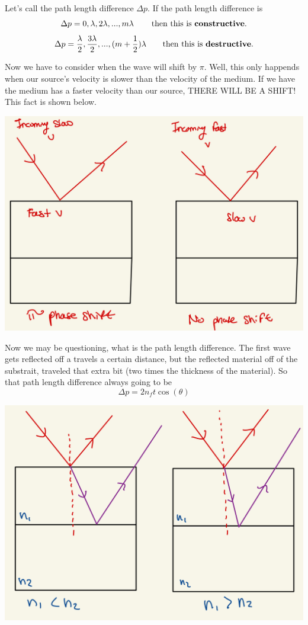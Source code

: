 \documentclass[10pt]{article}
\begin{document}
Let's call the path length difference $\Delta p$. If the path length difference is 
\[\Delta p = 0, \lambda, 2\lambda, ..., m\lambda\, \qquad \text{then this is \textbf{constructive}.}\]
\[\Delta p = \frac{\lambda}{2}, \frac{3\lambda}{2}, ..., (m+\frac{1}{2})\lambda \qquad \text{then this is \textbf{destructive}.}\]

Now we have to consider when the wave will shift by $\pi$. Well, this only happends when our source's velocity is slower than the velocity of the medium. If we have the medium has a faster velocity than our source, THERE WILL BE A SHIFT! This fact is shown below.

\begin{center}
    \includegraphics*[scale = .2]{imgs/shift-thin-film.jpeg}
\end{center}

\newpage

Now we may be questioning, what is the path length difference. The first wave gets reflected off a travels a certain distance, but the reflected material off of the substrait, traveled that extra bit (two times the thickness of the material). So that path length difference always going to be 
\[\Delta p = 2n_ft\cos(\theta)\]

\begin{center}
    \includegraphics*[scale = .2]{imgs/phase-shift-thin-film.jpeg}
\end{center}
\end{document}
